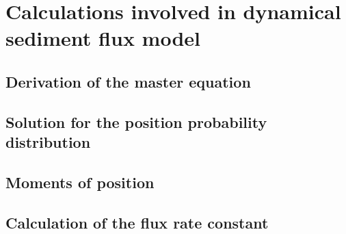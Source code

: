 
\chapter{Calculations involved in dynamical sediment flux model}


\section{Derivation of the master equation}
\section{Solution for the position probability distribution}
\section{Moments of position}
\section{Calculation of the flux rate constant}

